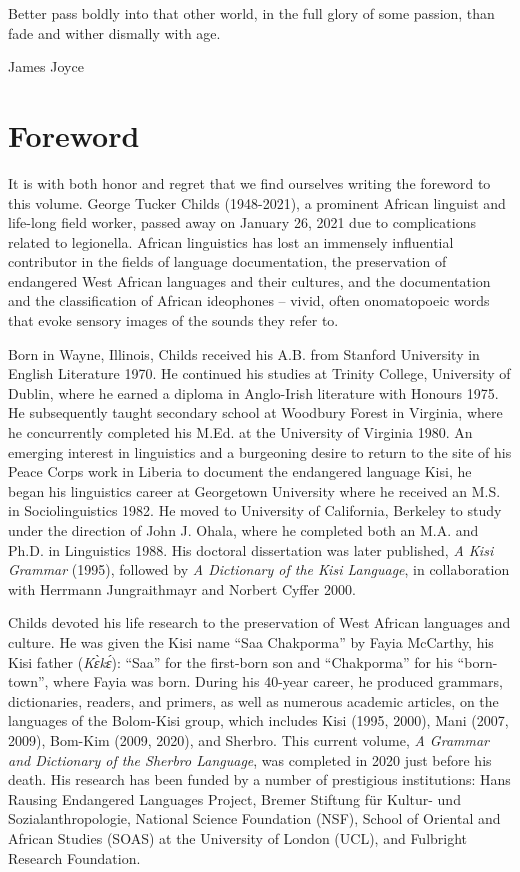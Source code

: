 \addchap{\lsPrefaceTitle}

\epigraph{Better pass boldly into that other world, in the full glory of some passion, than fade and wither dismally with age.}{James Joyce}

\section*{Foreword}

It is with both honor and regret that we find ourselves writing the foreword to this volume. George Tucker Childs (1948-2021), a prominent African linguist and life-long field worker, passed away on January 26, 2021 due to complications related to legionella. African linguistics has lost an immensely influential contributor in the fields of language documentation, the preservation of endangered West African languages and their cultures, and the documentation and the classification of African ideophones – vivid, often onomatopoeic words that evoke sensory images of the sounds they refer to.

Born in Wayne, Illinois, Childs received his A.B. from Stanford University in English Literature 1970. He continued his studies at Trinity College, University of Dublin, where he earned a diploma in Anglo-Irish literature with  Honours 1975. He subsequently taught secondary school at Woodbury Forest in Virginia, where he concurrently completed his M.Ed. at the University of  Virginia 1980. An emerging interest in linguistics and a burgeoning desire to return to the site of his Peace Corps work in Liberia to document the endangered language Kisi, he began his linguistics career at Georgetown University where he received an M.S. in Sociolinguistics 1982. He moved to University of California, Berkeley to study under the direction of John J. Ohala, where he completed both an M.A. and Ph.D. in Linguistics 1988. His doctoral dissertation was later published, \textit{A Kisi Grammar} (1995), followed by \textit{A Dictionary of the Kisi Language}, in collaboration with Herrmann Jungraithmayr and Norbert  {Cyffer 2000}.

Childs devoted his life research to the preservation of West African languages and culture. He was given the Kisi name “Saa Chakporma” by Fayia McCarthy, his Kisi father (\textit{Kɛ̀kɛ́}): “Saa” for the first-born son and “Chakporma” for his “born-town”, where Fayia was born. During his 40-year career, he produced grammars, dictionaries, readers, and primers, as well as numerous academic articles, on the languages of the Bolom-Kisi group, which includes Kisi (1995, 2000), Mani (2007, 2009), Bom-Kim (2009, 2020), and Sherbro. This current volume, \textit{A Grammar and Dictionary of the Sherbro Language}, was completed in 2020 just before his death. His research has been funded by a number of prestigious institutions: Hans Rausing Endangered Languages Project, Bremer Stiftung für Kultur- und Sozialanthropologie, National Science Foundation (NSF), School of Oriental and African Studies (SOAS) at the University of London (UCL), and Fulbright Research Foundation.

